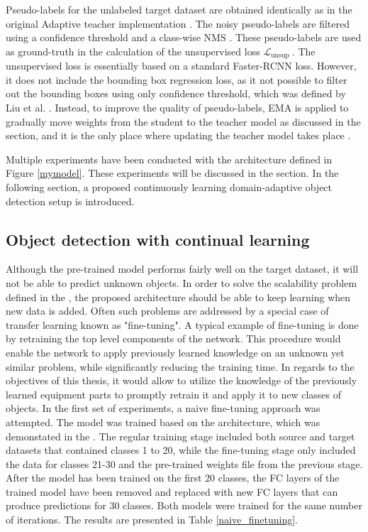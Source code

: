 Pseudo-labels for the unlabeled target dataset are obtained identically as in the original Adaptive teacher implementation \cite{Li2021}. The noisy pseudo-labels are filtered using a confidence threshold and a class-wise NMS \cite{Liu2021}. These pseudo-labels are used as ground-truth in the calculation of the unsupervised loss $\mathcal{L}_{\text {unsup }}$. The unsupervised loss is essentially based on a standard Faster-RCNN loss. However, it does not include the bounding box regression loss, as it not possible to filter out the bounding boxes using only confidence threshold, which was defined   by Liu et al. \cite{Liu2021}.  Instead, to improve the quality of pseudo-labels, EMA is applied to gradually move weights from the student to the teacher model as discussed in the   section, and it is the only place where updating the teacher model takes place \cite{Li2021}.  
 
Multiple experiments have been conducted with the architecture defined in Figure \ref{mymodel}. These experiments will be discussed in the  section. In the following section, a proposed continuously learning domain-adaptive object detection setup is introduced. 

\FloatBarrier

\subsection{Object detection with continual learning}
\label{cont_learning_section} 
Although the pre-trained model performs fairly well on the target dataset, it will not be able to predict unknown objects. In order to solve the scalability problem defined in the , the proposed architecture should be able to keep learning when new data is added. Often such problems are addressed by a special case of transfer learning known as "fine-tuning". A typical example of fine-tuning is done by retraining the top level components of the network. This procedure would enable the network to apply previously learned knowledge on an unknown yet similar problem, while significantly reducing the training time. In regards to the objectives of this thesis, it would allow to utilize the knowledge of the previously learned equipment parts to promptly retrain it and apply it to new classes of objects. 
In the first set of experiments, a naive fine-tuning approach was attempted. The model was trained based on the architecture, which was demonstated in the . The regular training stage included both source and target datasets that contained classes 1 to 20, while the fine-tuning stage only included the data for classes 21-30 and the pre-trained weights file from the previous stage. After the model has been trained on the first 20 classes, the FC layers of the trained model have been removed and replaced with new FC layers that can produce predictions for 30 classes. Both models were trained for the same number of iterations. The results are presented in Table \ref{naive_finetuning}.

